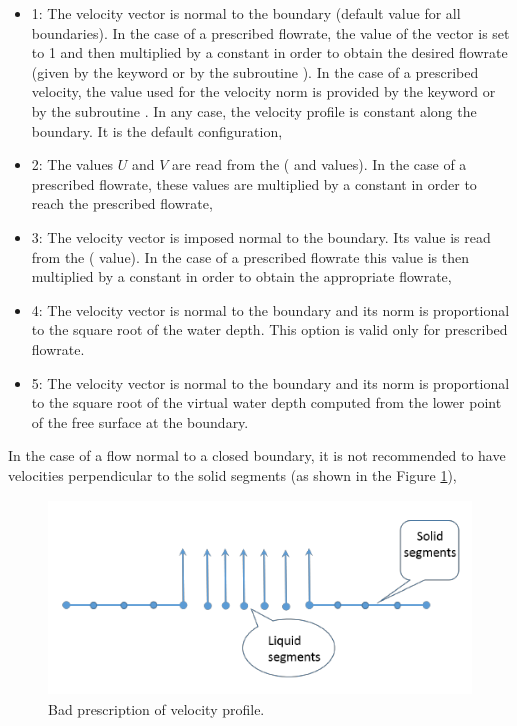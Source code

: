 \begin{itemize}
\item 1: The velocity vector is normal to the boundary
(default value for all boundaries).
In the case of a prescribed flowrate, the value of the vector is set to 1
and then multiplied by a constant in order to obtain the desired flowrate
(given by the keyword  or by the subroutine
).
In the case of a prescribed velocity, the value used for the velocity norm
is provided by the keyword 
or by the subroutine .
In any case, the velocity profile is constant along the boundary.
It is the default configuration,

\item 2: The values $U$ and $V$ are read from the
( and  values).
In the case of a prescribed flowrate, these values are multiplied by a constant
in order to reach the prescribed flowrate,

\item 3: The velocity vector is imposed normal to the boundary.
Its value is read from the  (
value).
In the case of a prescribed flowrate this value is then multiplied by a constant
in order to obtain the appropriate flowrate,

\item 4: The velocity vector is normal to the boundary and its norm
is proportional to the square root of the water depth.
This option is valid only for prescribed flowrate.

\item 5: The velocity vector is normal to the boundary and its norm
is proportional to the square root of the virtual water depth computed
from the lower point of the free surface at the boundary.
\end{itemize}

In the case of a flow normal to a closed boundary, it is not recommended to have
velocities perpendicular to the solid segments
(as shown in the Figure \ref{bad:prescr:vel:prof}),
\begin{figure}
\includegraphics*[width=5.24in, height=2.04in, keepaspectratio=false]{./graphics/bad_profile.png}
\caption{Bad prescription of velocity profile.}
\label{bad:prescr:vel:prof}
\end{figure}

